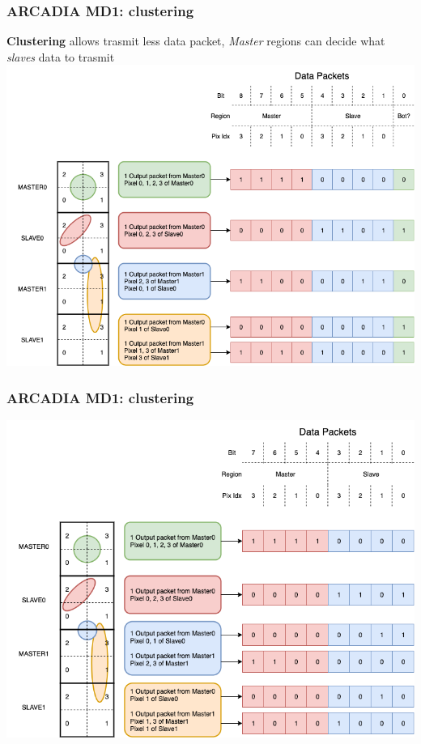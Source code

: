     \begin{frame}[noframenumbering]
        \frametitle{ARCADIA MD1: clustering}
            \textbf{Clustering} allows trasmit less data packet, 
            \textit{Master} regions can decide what \textit{slaves} data to trasmit
            \includegraphics[width=.85\linewidth]{figures/ARCADIA/clustering.png}
    \end{frame}

    \begin{frame}[noframenumbering]
        \frametitle{ARCADIA MD1: clustering}
            \includegraphics[width=.9\linewidth]{figures/ARCADIA/nonclustering.png}
    \end{frame}



